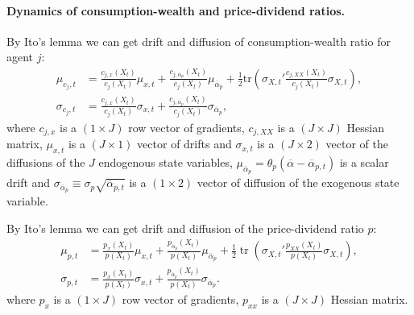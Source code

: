 \documentclass[12pt,english]{article}
\DeclareMathOperator{\tr}{tr}
\begin{document}
\paragraph{Dynamics of consumption-wealth and price-dividend ratios.}
By Ito's lemma we can get drift and diffusion of consumption-wealth ratio for agent $ j $:
\begin{align}
	\mu_{c_{j},t}&=\frac{c_{j,x}(X_t)}{c_j(X_t)}\mu_{x,t}+\frac{c_{j,\overline{\alpha}_p}(X_t)}{c_j(X_t)}\mu_{\overline{\alpha}_p}+
	\frac{1}{2}\text{tr}\left(\sigma_{X,t}'\frac{c_{j,XX}(X_t)}{c_j(X_t)}\sigma_{X,t}\right)\label{eq:mu-cj},\\%
	\sigma_{c_j,t}&=\frac{c_{j,x}(X_t)}{c_j(X_t)} \sigma_{x,t} + \frac{c_{j,{\overline{\alpha}_p}}(X_t)}{c_j(X_t)}\sigma_{\overline{\alpha}_p}, \label{eq:sigma-cj}
\end{align}
where $ c_{j,x} $ is a $ (1\times J )$ row vector of gradients, $ c_{j,XX} $ is a $ (J\times J) $ Hessian matrix, $ \mu_{x,t} $ is a $ (J\times 1) $ vector of drifts and $ \sigma_{x,t} $ is a $ (J\times2) $ vector of the diffusions of the $ J $ endogenous state variables, $\mu_{\overline{\alpha}_p}= \theta_p\left(\overline{\alpha}-\overline{\alpha}_{p,t}\right) $ is a scalar drift and $ \sigma_{\overline{\alpha}_p}\equiv \sigma_{p} \sqrt{\overline{\alpha}_{p,t}} $ is a $ (1\times 2) $ vector of diffusion of the exogenous state variable.

By Ito's lemma we can get drift and diffusion of the price-dividend ratio $ p $:
\begin{align}
	\mu_{p,t}&=\frac{p_x(X_t)}{p(X_t)}\mu_{x,t}+\frac{p_{\overline{\alpha}_p}(X_t)}{p(X_t)}\mu_{\overline{\alpha}_p}+\frac{1}{2}\tr\left(\sigma_{X,t}'\frac{p_{XX}(X_t)}{p(X_t)}\sigma_{X,t}\right),\\
	\sigma_{p,t} &= \frac{p_x(X_t)}{p(X_t)} \sigma_{x,t} + \frac{p_{\overline{\alpha}_p}(X_t)}{p(X_t)} \sigma_{\overline{\alpha}_p}. 
\end{align}
where $ p_{x} $ is a $ (1\times J) $ row vector of gradients, $ p_{xx} $ is a $ (J\times J) $ Hessian matrix. 
\end{document}
